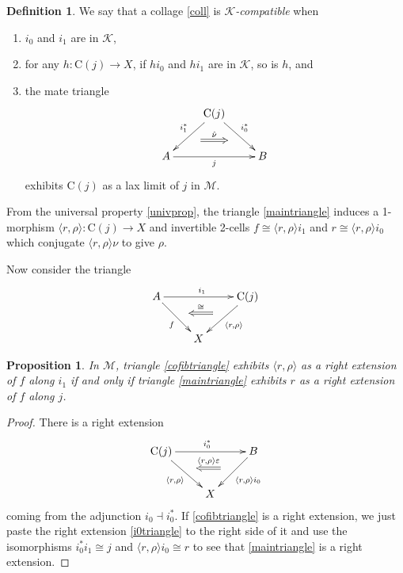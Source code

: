 \documentclass[a4paper,12pt]{article}
\newtheorem{proposition}[theorem]{Proposition}
\theoremstyle{definition}
\newtheorem*{Definition}{Definition}%
\theoremstyle{fact}
\theoremstyle{genquest}
\theoremstyle{step}
\newcommand{\lra}{\longrightarrow}
\def\CK{{\mathscr K}}
\def\CM{{\mathscr M}}
\begin{document}
{\begin{Definition} We say that a collage \eqref{coll} is {\em $\CK$-compatible} when 
\begin{enumerate}
\item $i_0$ and $i_1$ are in $\CK$,
\item for any $h:\mathrm{C}(j) \lra X$, if $hi_0$ and $hi_1$ are in $\CK$, so is $h$, and 
\item the mate triangle 
\begin{equation}\label{laxlim}
\begin{aligned}
\xymatrix{
& \mathrm{C}(j) \ar[ld]_{i_1^*}^(0.5){\phantom{a}}="1"   \ar[rd]^{i_0^*}_(0.5){\phantom{a}}="2" \ar@{=>}"1";"2"^-{\hat{\nu}}
\\
A \ar[rr]_-{j} && B 
}
\end{aligned}
\end{equation}
exhibits $\mathrm{C}(j)$ as a lax limit of $j$ in $\CM$.
\end{enumerate}
\end{Definition} 

From the universal property \eqref{univprop}, the triangle \eqref{maintriangle} induces a 1-morphism
$\langle r, \rho \rangle : \mathrm{C}(j) \lra X$ and invertible 2-cells $f\cong \langle r, \rho \rangle i_1$ and $r \cong \langle  r, \rho \rangle i_0$
which conjugate $\langle  r, \rho \rangle \nu$ to give $\rho$.  

Now consider the triangle
\begin{equation}\label{cofibtriangle}
\begin{aligned}
\xymatrix{
A \ar[rd]_{f}^(0.5){\phantom{a}}="1" \ar[rr]^{i_1}  && \mathrm{C}(j) \ar[ld]^{\langle r, \rho \rangle}_(0.5){\phantom{a}}="2" \ar@{<=}"1";"2"^-{\cong}
\\
& X 
}
\end{aligned}
\end{equation}

\begin{proposition}\label{equivformext}  
In $\CM$, triangle \eqref{cofibtriangle} exhibits $\langle r, \rho \rangle$ as a right extension of $f$ along $i_1$ if and only if triangle \eqref{maintriangle} exhibits $r$ as a right extension of $f$ along $j$.
\end{proposition} 
\begin{proof} 
There is a right extension
\begin{equation}\label{i0triangle}
\begin{aligned}
\xymatrix{
\mathrm{C}(j) \ar[rd]_{\langle r, \rho \rangle}^(0.5){\phantom{a}}="1" \ar[rr]^{i_0^*}  && B \ar[ld]^{\langle r, \rho \rangle i_0}_(0.5){\phantom{a}}="2" \ar@{<=}"1";"2"^-{\langle r, \rho \rangle \varepsilon}
\\
& X 
}
\end{aligned}
\end{equation}
coming from the adjunction $i_0 \dashv i_0^*$.
If \eqref{cofibtriangle} is a right extension, we just paste the right extension \eqref{i0triangle} to the right side of it and use the isomorphisms $i_0^*i_1 \cong j$ and $\langle r,\rho \rangle i_0 \cong r$ 
to see that \eqref{maintriangle} is a right extension.  


\end{proof}}
\end{document}
